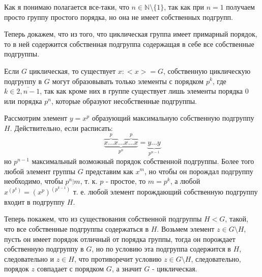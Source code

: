 \documentclass[a4paper,12pt]{article}
\begin{document}
\begin{Proof}
Как я понимаю полагается все-таки, что $n \in \mathbb{N} \setminus \{1\}$, так как при $n = 1$ получаем просто группу простого порядка, но она не имеет собственных подгрупп.

Теперь докажем, что из того, что циклическая группа имеет примарный порядок, то в ней содержится собственная подгруппа содержащая в себе все собственные подгруппы.

Если $G$ циклическая, то существует $x : <x> = G$, собственную циклическую подгруппу в $G$ могут образовывать только элементы с порядком $p^k$, где $k \in \overline{2,n-1}$, так как кроме них в группе существует лишь элементы порядка 0 или порядка $p^n$, которые образуют несобственные подгруппы.

Рассмотрим элемент $y = x^p$ образующий максимальную собственную подгруппу $H$. Действительно, если расписать:
\[
	\underbrace{\overbrace{x ... x}^p ... \overbrace{x ... x}^p}_{p^n} = \underbrace{y ... y}_{p^{n-1}}
\]
но $p^{n-1}$ максимальный возможный порядок собственной подгруппы. Более того любой элемент группы $G$ представим как $x^m$, но чтобы он порождал подгруппу необходимо, чтобы $p^n \vdots m$, т. к. $p$ - простое, то $m = p^k$, а любой $x^{\left(p^k\right)} = \left(x^p\right)^{\left(p^{k-1}\right)}$ т. е. любой элемент порождающий собственную подгруппу входит в подгруппу $H$.

Теперь покажем, что из существования собственной подгруппы $H < G$, такой, что все собственные подгруппы содержаться в $H$. Возьмем элемент $z \in G \setminus H$, пусть он имеет порядок отличный от порядка группы, тогда он порождает собственную подгруппу в $G$, но по условию эта подгруппа содержится в $H$, следовательно и $z \in H$, что противоречит условию $z \in G \setminus H$, следовательно, порядок $z$ совпадает с порядком $G$, а значит $G$ - циклическая.
\end{Proof}
\end{document}
